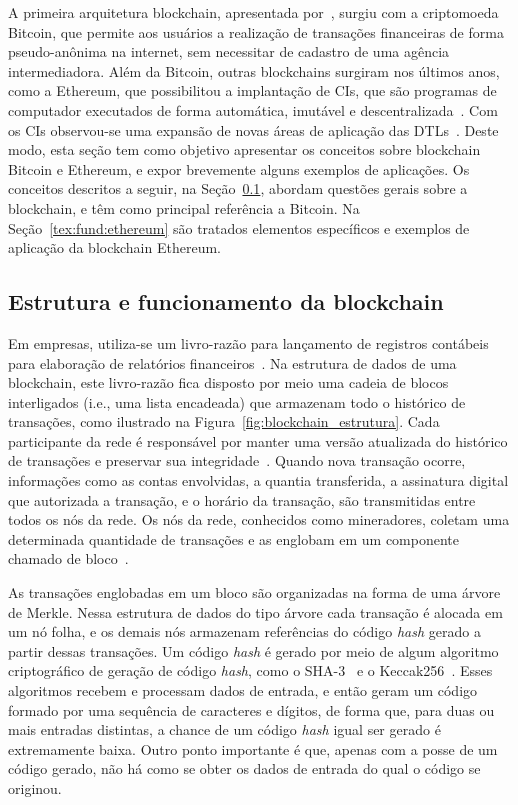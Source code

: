 A primeira arquitetura blockchain, apresentada por~, surgiu com a criptomoeda Bitcoin, que permite aos usuários a realização de transações financeiras de forma pseudo-anônima na internet, sem necessitar de cadastro de uma agência intermediadora. Além da Bitcoin, outras blockchains surgiram nos últimos anos, como a Ethereum, que possibilitou a implantação de CIs, que são programas de computador executados de forma automática, imutável e descentralizada~\cite{ethereum2014whitepaper}. Com os CIs observou-se uma expansão de novas áreas de aplicação das DTLs~\cite{maesa2020blockchain3.0}. Deste modo, esta seção tem como objetivo apresentar os conceitos sobre blockchain Bitcoin e Ethereum, e expor brevemente alguns exemplos de aplicações. Os conceitos descritos a seguir, na Seção~\ref{tex:fund:blockchain:estrutura}, abordam questões gerais sobre a blockchain, e têm como principal referência a Bitcoin. Na Seção~\ref{tex:fund:ethereum} são tratados elementos específicos e exemplos de aplicação da blockchain Ethereum.

\subsection{Estrutura e funcionamento da blockchain} \label{tex:fund:blockchain:estrutura}

Em empresas, utiliza-se um livro-razão para lançamento de registros contábeis para elaboração de relatórios financeiros~\cite{marion1985contabilidade}. Na estrutura de dados de uma blockchain, este livro-razão fica disposto por meio uma cadeia de blocos interligados (i.e., uma lista encadeada) que armazenam todo o histórico de transações, como ilustrado na Figura~\ref{fig:blockchain_estrutura}. Cada participante da rede é responsável por manter uma versão atualizada do histórico de transações e preservar sua integridade~\cite{overview-blockchainbasic2018drescher}. Quando nova transação ocorre, informações como as contas envolvidas, a quantia transferida, a assinatura digital que autorizada a transação, e o horário da transação, são transmitidas entre todos os nós da rede. Os nós da rede, conhecidos como mineradores, coletam uma determinada quantidade de transações e as englobam em um componente chamado de bloco~\cite{overview-blockchainbasic2018drescher}. 

As transações englobadas em um bloco são organizadas na forma de uma árvore de Merkle. Nessa estrutura de dados do tipo árvore cada transação é alocada em um nó folha, e os demais nós armazenam referências do código \textit{hash} gerado a partir dessas transações. Um código \textit{hash} é gerado por meio de algum algoritmo criptográfico de geração de código \textit{hash}, como o SHA-3~\cite{dworkin2015sha3} e o Keccak256~\cite{bertoni2020keccak}. Esses algoritmos recebem e processam dados de entrada, e então geram um código formado por uma sequência de caracteres e dígitos, de forma que, para duas ou mais entradas distintas, a chance de um código \textit{hash} igual ser gerado é extremamente baixa. Outro ponto importante é que, apenas com a posse de um código gerado, não há como se obter os dados de entrada do qual o código se originou.

